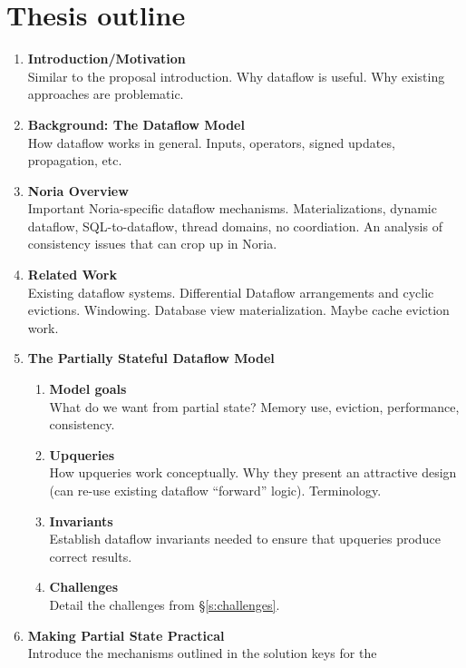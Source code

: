 \documentclass[12pt,letterpaper,twoside]{article}
\begin{document}
\section{Thesis outline}

\begin{enumerate}

 \item \textbf{Introduction/Motivation}\\
   Similar to the proposal introduction. Why dataflow is useful. Why
   existing approaches are problematic.
 \item \textbf{Background: The Dataflow Model}\\
   How dataflow works in general. Inputs, operators, signed updates,
   propagation, etc.
 \item \textbf{Noria Overview}\\
   Important Noria-specific dataflow mechanisms. Materializations,
   dynamic dataflow, SQL-to-dataflow, thread domains, no coordiation.
   An analysis of consistency issues that can crop up in Noria.
 \item \textbf{Related Work}\\
   Existing dataflow systems. Differential Dataflow arrangements and
   cyclic evictions. Windowing. Database view materialization. Maybe
   cache eviction work.
 \item \textbf{The Partially Stateful Dataflow Model}
   \begin{enumerate}
   \item \textbf{Model goals}\\
     What do we want from partial state? Memory use, eviction,
     performance, consistency.
   \item \textbf{Upqueries}\\
     How upqueries work conceptually. Why they present an attractive
     design (can re-use existing dataflow ``forward'' logic). Terminology.
   \item \textbf{Invariants}\\
     Establish dataflow invariants needed to ensure that upqueries
     produce correct results.
   \item \textbf{Challenges}\\
     Detail the challenges from \S\ref{s:challenges}.
   \end{enumerate}
 \item \textbf{Making Partial State Practical}\\
   Introduce the mechanisms outlined in the solution keys for the

\end{enumerate}
\end{document}
